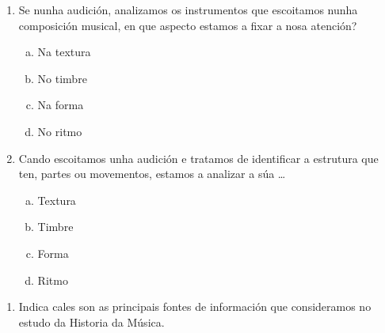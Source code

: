 % 
%

\begin{multicols}{2}

\begin{ejercicio}
 \begin{enumerate}[1)]
  \item 
  Se nunha audición, analizamos os instrumentos que escoitamos nunha composición musical, en que aspecto estamos a fixar a nosa atención?

  \begin{enumerate}[a)]
   \item 
   Na textura
   \item %
   No timbre
   \item
   Na forma
   \item
   No ritmo
  
  \end{enumerate}
  
  \item
   Cando escoitamos unha audición e tratamos de identificar a estrutura que ten, partes ou movementos, estamos a analizar a súa \ldots
  
  \begin{enumerate}[a)]
   \item 
   Textura
   \item 
   Timbre
   \item %
   Forma
   \item
   Ritmo
  \end{enumerate}
 
 \end{enumerate}

\end{ejercicio}





\begin{ejercicio}
 \begin{enumerate}[1)]
  \item 
  Indica cales son as principais fontes de información que consideramos no estudo da Historia da Música.


\end{enumerate}
\end{ejercicio}
\end{multicols}
